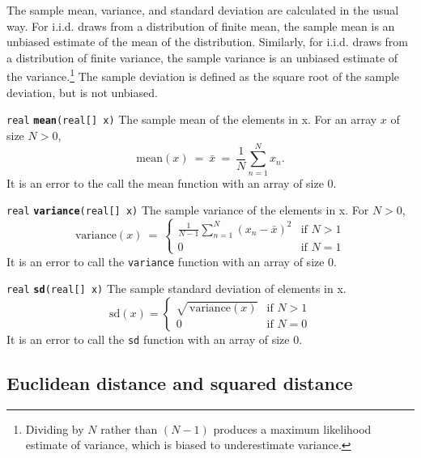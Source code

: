 \documentclass[
  10pt,
]{book}
\begin{document}
The sample mean, variance, and standard deviation are calculated in
the usual way. For i.i.d. draws from a distribution of finite mean,
the sample mean is an unbiased estimate of the mean of the
distribution. Similarly, for i.i.d. draws from a distribution of
finite variance, the sample variance is an unbiased estimate of the
variance.\footnote{Dividing by \(N\) rather than \((N-1)\) produces a maximum
  likelihood estimate of variance, which is biased to underestimate
  variance.} The sample deviation is defined as the square root
of the sample deviation, but is not unbiased.


\texttt{real} \textbf{\texttt{mean}}\texttt{(real{[}{]}\ x)}\newline
The sample mean of the elements in x. For an array \(x\) of size \(N > 0\), \[ \text{mean}(x) \ = \ \bar{x} \ = \ \frac{1}{N} \sum_{n=1}^N
x_n. \] It is an error to the call the mean function with an array of
size \(0\).


\texttt{real} \textbf{\texttt{variance}}\texttt{(real{[}{]}\ x)}\newline
The sample variance of the elements in x. For \(N > 0\), \[
\text{variance}(x) \ = \ \begin{cases} \frac{1}{N-1} \sum_{n=1}^N (x_n
- \bar{x})^2 & \text{if } N > 1 \\[4pt] 0 & \text{if } N = 1
\end{cases} \] It is an error to call the \texttt{variance} function with an
array of size 0.


\texttt{real} \textbf{\texttt{sd}}\texttt{(real{[}{]}\ x)}\newline
The sample standard deviation of elements in x. \[ \text{sd}(x) =
\begin{cases} \sqrt{\, \text{variance}(x)} & \text{if } N > 1 \\[4pt]
0 & \text{if } N = 0 \end{cases} \] It is an error to call the \texttt{sd}
function with an array of size 0.

\hypertarget{euclidean-distance-and-squared-distance}{%
\subsection{Euclidean distance and squared distance}\label{euclidean-distance-and-squared-distance}}
\end{document}
